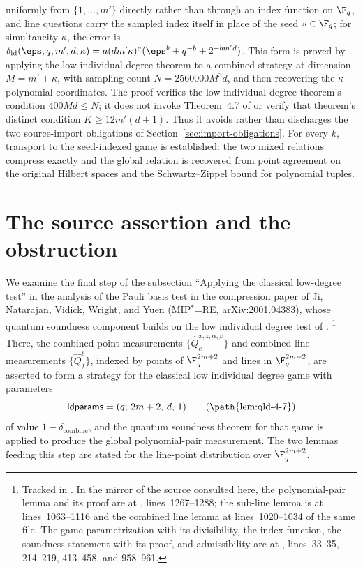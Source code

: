 \documentclass[11pt]{article}
\begin{document}
\begin{enumerate}
  uniformly from $\{1,\ldots,m'\}$ directly rather than through an index
  function on $\F_q$, and line questions carry the sampled index itself in
  place of the seed $s \in \F_q$; for simultaneity $\kappa$, the error is
  $\delta_{\mathrm{ld}}(\eps,q,m',d,\kappa)
  = a(dm'\kappa)^a(\eps^b + q^{-b} + 2^{-bm'd})$.  This form is proved by
  applying the low individual degree theorem to a combined strategy at
  dimension $M=m'+\kappa$, with sampling count $N=2560000M^3d$, and then
  recovering the $\kappa$ polynomial coordinates.  The proof verifies the low
  individual degree theorem's condition $400Md \le N$; it does not invoke
  Theorem~4.7 of \cite{Ji2021Quantum} or verify that theorem's distinct
  condition $K \ge 12m'(d+1)$.  Thus it avoids rather than discharges the
  two source-import obligations of Section~\ref{sec:import-obligations}.
  For every $k$, transport to the seed-indexed game is established: the two
  mixed relations compress exactly and the global relation is recovered
  from point agreement on the original Hilbert spaces and the
  Schwartz--Zippel bound for polynomial tuples.
\end{enumerate}

\section{The source assertion and the obstruction}

We examine the final step of the subsection ``Applying the classical
low-degree test'' in the analysis of the Pauli basis test in the compression
paper of Ji, Natarajan, Vidick, Wright, and Yuen (MIP$^{*}$=RE,
arXiv:2001.04383), whose quantum soundness component builds on the low
individual degree test of \cite{Ji2020LowIndividualDegree}.%
\footnote{Tracked in .  In the mirror of the source
consulted here, the polynomial-pair lemma and its proof are at
,
lines~1267--1288; the sub-line lemma is at lines~1063--1116 and the combined
line lemma at lines~1020--1034 of the same file.  The game parametrization
with its divisibility, the index function, the soundness statement with its
proof, and admissibility are at
,
lines~33--35, 214--219, 413--458, and 958--961.}
There, the combined point measurements
$\{\hat Q^{x,z,\alpha,\beta}_c\}$ and combined line measurements
$\{\hat Q^{\ell}_f\}$, indexed by points of $\F_q^{2m+2}$ and lines in
$\F_q^{2m+2}$, are asserted to form a strategy for the classical low
individual degree game with parameters
\[
  \mathsf{ldparams} = (q,\, 2m+2,\, d,\, 1)
  \tag{\path{lem:qld-4-7}}
\]
of value $1 - \delta_{\mathrm{combine}}$, and the quantum soundness theorem
for that game is applied to produce the global polynomial-pair measurement.
The two lemmas feeding this step are stated for the line-point distribution
over $\F_q^{2m+2}$.
\end{document}
